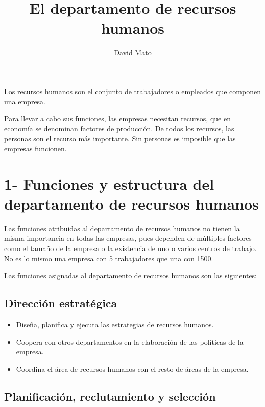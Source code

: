 \documentclass{article}
\title{El departamento de recursos humanos}
\author{David Mato}
\date{} %
\begin{document}
	
	\maketitle %
	
	\date{} %
	
	\maketitle
	
	Los recursos humanos son el conjunto de trabajadores o empleados que componen una empresa.
	
	Para llevar a cabo sus funciones, las empresas necesitan recursos, que en economía se denominan factores de producción. De todos los recursos, las personas son el recurso más importante. Sin personas es imposible que las empresas funcionen.
	
	\section{1- Funciones y estructura del departamento de recursos humanos}
	
	Las funciones atribuidas al departamento de recursos humanos no tienen la misma importancia en todas las empresas, pues dependen de múltiples factores como el tamaño de la empresa o la existencia de uno o varios centros de trabajo. No es lo mismo una empresa con 5 trabajadores que una con 1500.
	
	Las funciones asignadas al departamento de recursos humanos son las siguientes:
	
	\subsection*{Dirección estratégica}
	
	\begin{itemize}
		\item Diseña, planifica y ejecuta las estrategias de recursos humanos.
		\item Coopera con otros departamentos en la elaboración de las políticas de la empresa.
		\item Coordina el área de recursos humanos con el resto de áreas de la empresa.
	\end{itemize}
	
	\subsection*{Planificación, reclutamiento y selección}
	
\end{document}
